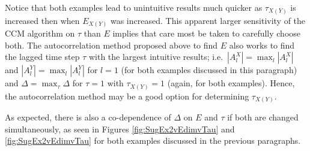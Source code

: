 \documentclass[a4paper,11pt]{article}
\begin{document}
Notice that both examples lead to unintuitive results much quicker as $\tau_{X(Y)}$ is increased then when $E_{X(Y)}$ was increased.  This apparent larger sensitivity of the CCM algorithm on $\tau$ than $E$ implies that care most be taken to carefully choose both.  The autocorrelation method proposed above to find $E$ also works to find the lagged time step $\tau$ with the largest intuitive results; i.e.\ $|A_l^X|=\max_l |A_l^X|$ and $|A_l^Y|=\max_l |A_l^Y|$ for $l=1$ (for both examples discussed in this paragraph) and $\Delta = \max_\tau \Delta$ for $\tau=1$ with $\tau_{X(Y)}=1$ (again, for both examples).  Hence, the autocorrelation method may be a good option for determining $\tau_{X(Y)}$.

As expected, there is also a co-dependence of $\Delta$ on $E$ and $\tau$ if both are changed simultaneously, as seen in Figures \ref{fig:SugEx2vEdimvTau} and \ref{fig:SugEx2vEdimvTau} for both examples discussed in the previous paragraphs.
\end{document}
